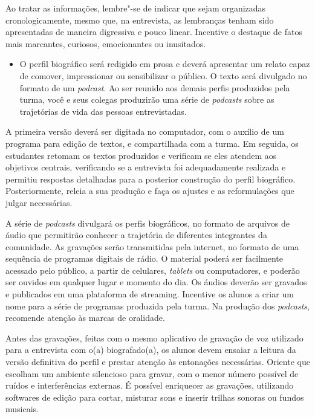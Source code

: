 \documentclass[12pt]{extarticle}
\begin{document}
Ao tratar as informações, lembre"-se de indicar que sejam organizadas
cronologicamente, mesmo que, na entrevista, as lembranças tenham sido
apresentadas de maneira digressiva e pouco linear. Incentive o destaque
de fatos mais marcantes, curiosos, emocionantes ou inusitados.

\begin{itemize}
\item
  O perfil biográfico será redigido em prosa e deverá apresentar um
  relato capaz de comover, impressionar ou sensibilizar o público. O
  texto será divulgado no formato de um \emph{podcast}. Ao ser reunido
  aos demais perfis produzidos pela turma, você e seus colegas
  produzirão uma série de \emph{podcasts} sobre as trajetórias de vida
  das pessoas entrevistadas.
\end{itemize}

A primeira versão deverá ser digitada no computador, com o auxílio de um
programa para edição de textos, e compartilhada com a turma. Em seguida,
os estudantes retomam os textos produzidos e verificam se eles atendem
aos objetivos centrais, verificando se a entrevista foi adequadamente
realizada e permitiu respostas detalhadas para a posterior construção do
perfil biográfico. Posteriormente, releia a sua produção e faça os
ajustes e as reformulações que julgar necessárias.

A série de \emph{podcasts} divulgará os perfis biográficos, no formato
de arquivos de áudio que permitirão conhecer a trajetória de diferentes
integrantes da comunidade. As gravações serão transmitidas pela
internet, no formato de uma sequência de programas digitais de rádio. O
material poderá ser facilmente acessado pelo público, a partir de
celulares, \emph{tablets} ou computadores, e poderão ser ouvidos em
qualquer lugar e momento do dia. Os áudios deverão ser gravados e
publicados em uma plataforma de streaming. Incentive os alunos a criar
um nome para a série de programas produzida pela turma. Na produção dos
\emph{podcasts}, recomende atenção às marcas de oralidade.

Antes das gravações, feitas com o mesmo aplicativo de gravação de voz
utilizado para a entrevista com o(a) biografado(a), os alunos devem
ensaiar a leitura da versão definitiva do perfil e prestar atenção às
entonações necessárias. Oriente que escolham um ambiente silencioso para
gravar, com o menor número possível de ruídos e interferências externas.
É possível enriquecer as gravações, utilizando softwares de edição para
cortar, misturar sons e inserir trilhas sonoras ou fundos musicais.
\end{document}
